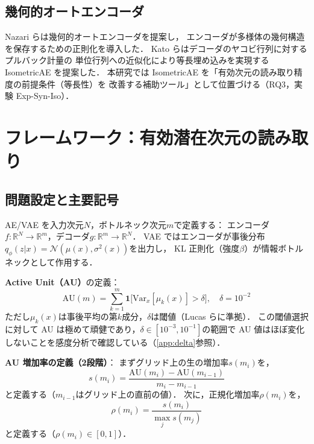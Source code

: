 \documentclass[11pt,a4paper]{jsarticle}
\newcommand{\R}{\mathbb{R}}
\begin{document}
\subsection{幾何的オートエンコーダ}\label{sec:related_geo}

Nazari ら\cite{nazari2023geometric}は幾何的オートエンコーダを提案し，
エンコーダが多様体の幾何構造を保存するための正則化を導入した．
Kato ら\cite{kato2020rdae}はデコーダのヤコビ行列に対するプルバック計量の
単位行列への近似化により等長埋め込みを実現する IsometricAE を提案した．
本研究では IsometricAE を「有効次元の読み取り精度の前提条件（等長性）を
改善する補助ツール」として位置づける（RQ3，実験 Exp-Syn-Iso）．

\section{フレームワーク：有効潜在次元の読み取り}\label{sec:framework}

\subsection{問題設定と主要記号}\label{sec:framework_setup}

AE/VAE を入力次元$N$，ボトルネック次元$m$で定義する：
エンコーダ$f: \R^N \to \R^m$，デコーダ$g: \R^m \to \R^N$．
VAE ではエンコーダが事後分布$q_\phi(z|x) = \mathcal{N}(\mu(x), \sigma^2(x))$を出力し，
KL 正則化（強度$\beta$）が情報ボトルネックとして作用する．

\textbf{Active Unit（AU）}の定義：
\begin{equation}
  \mathrm{AU}(m) = \sum_{k=1}^{m} \mathbf{1}\bigl[\mathrm{Var}_x[\mu_k(x)] > \delta\bigr],
  \quad \delta = 10^{-2}
  \label{eq:au_def}
\end{equation}
ただし$\mu_k(x)$は事後平均の第$k$成分，$\delta$は閾値（Lucas ら\cite{lucas2019elbo}に準拠）．
この閾値選択に対して AU は極めて頑健であり，$\delta \in [10^{-3}, 10^{-1}]$の範囲で AU 値はほぼ変化しないことを感度分析で確認している（\ref{app:delta}参照）．

\textbf{AU 増加率の定義（2段階）}：
まずグリッド上の生の増加率$s(m_i)$を，
\begin{equation}
  s(m_i) = \frac{\mathrm{AU}(m_i) - \mathrm{AU}(m_{i-1})}{m_i - m_{i-1}}
  \label{eq:au_raw_rate}
\end{equation}
と定義する（$m_{i-1}$はグリッド上の直前の値）．
次に，正規化増加率$\rho(m_i)$を，
\begin{equation}
  \rho(m_i) = \frac{s(m_i)}{\max_j s(m_j)}
  \label{eq:au_rate}
\end{equation}
と定義する（$\rho(m_i) \in [0, 1]$）．
\end{document}
